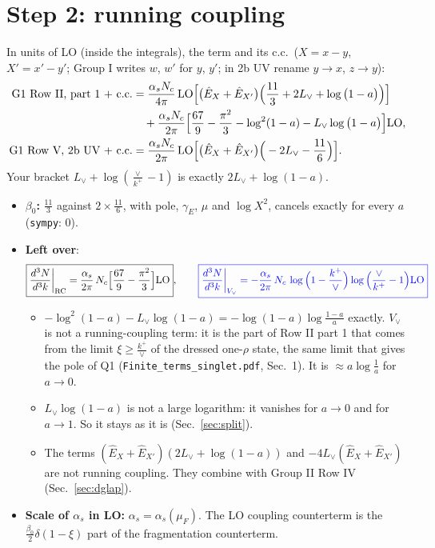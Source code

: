 \documentclass[10pt]{article}
\numberwithin{equation}{section}
\newcommand{\new}[1]{{\color{blue}#1}}
\newcommand{\Lv}{L_{\vee}}
\newcommand{\Eh}{\hat E}
\newcommand{\la}{\log\big(1-a\big)}
\begin{document}
\section{Step 2: running coupling}\label{sec:rc}
In units of LO (inside the integrals), the term and its c.c.\ ($X=x-y$, $X'=x'-y'$; Group I writes $w$, $w'$ for $y$, $y'$; in 2b UV rename $y\to x$, $z\to y$):
\begin{align}
\text{G1 Row II, part 1 $+$ c.c.}&=\frac{\alpha_sN_c}{4\pi}\,{\rm LO}\Big[\big(\Eh_X+\Eh_{X'}\big)\Big(\frac{11}{3}+2\Lv+\la\Big)\Big]\notag\\
&\quad+\frac{\alpha_sN_c}{2\pi}\Big[\frac{67}{9}-\frac{\pi^2}{3}-\log^2(1-a)-\Lv\la\Big]{\rm LO},\label{eq:rcII}\\
\text{G1 Row V, 2b UV $+$ c.c.}&=\frac{\alpha_sN_c}{2\pi}\,{\rm LO}\Big[\big(\Eh_X+\Eh_{X'}\big)\Big(-2\Lv-\frac{11}{6}\Big)\Big].\label{eq:rcV}
\end{align}
Your bracket $\Lv+\log(\frac{\vee}{k^+}-1)$ is exactly $2\Lv+\log(1-a)$.
\begin{itemize}
\item \textbf{$\beta_0$:} $\frac{11}{3}$ against $2\times\frac{11}{6}$, with pole, $\gamma_E$, $\mu$ and $\log X^2$, cancels exactly for every $a$ (\texttt{sympy}: $0$).
\item \textbf{Left over}:
\begin{equation}
\boxed{\frac{d^3N}{d^3k}\bigg|_{\rm RC}=\frac{\alpha_s}{2\pi}\,N_c\Big[\frac{67}{9}-\frac{\pi^2}{3}\Big]{\rm LO}},\qquad
\new{\boxed{\frac{d^3N}{d^3k}\bigg|_{V_\vee}=-\frac{\alpha_s}{2\pi}\,N_c\,\log\Big(1-\frac{k^+}{\vee}\Big)\log\Big(\frac{\vee}{k^+}-1\Big){\rm LO}}}
\label{eq:rc}
\end{equation}
\begin{itemize}
\item \new{$-\log^2(1-a)-\Lv\log(1-a)=-\log(1-a)\log\frac{1-a}{a}$ exactly. $V_\vee$ is not a running-coupling term: it is the part of Row II part 1 that comes from the limit $\xi\ge\frac{k^+}{\vee}$ of the dressed one-$\rho$ state, the same limit that gives the pole of Q1 (\texttt{Finite\_terms\_singlet.pdf}, Sec.~1). It is $\approx a\log\frac1a$ for $a\to0$.}
\item $\Lv\log(1-a)$ is not a large logarithm: it vanishes for $a\to0$ and for $a\to1$. So it stays as it is (Sec.~\ref{sec:split}).
\item The terms $(\Eh_X+\Eh_{X'})(2\Lv+\log(1-a))$ and $-4\Lv(\Eh_X+\Eh_{X'})$ are not running coupling. They combine with Group II Row IV (Sec.~\ref{sec:dglap}).
\end{itemize}
\item \textbf{Scale of $\alpha_s$ in LO:} $\alpha_s=\alpha_s(\mu_F)$. The LO coupling counterterm is the $\frac{\beta_0}{2}\delta(1-\xi)$ part of the fragmentation counterterm.
\end{itemize}
\end{document}
